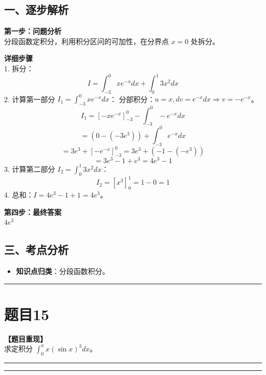 \documentclass[12pt, a4paper]{ctexart}
\newcommand{\TopSeparator}{
    \par\noindent\rule{\textwidth}{1.5pt}\vspace{0.5em} %
}
\newcommand{\AnalysisSeparator}{
    \par\noindent\rule{\textwidth}{0.5pt}\vspace{0.2em}\hrule\vspace{0.5em} %
}
\newenvironment{RedAnalysis}{
    \par
    \color{red} %
}{
    \par
    \color{black} %
}
\begin{document}
\begin{RedAnalysis}

\subsection*{一、逐步解析}

\textbf{第一步：问题分析} \\
分段函数定积分，利用积分区问的可加性，在分界点 $x=0$ 处拆分。

\textbf{详细步骤} \\
1. 拆分：
   \[ I = \int_{-3}^0 xe^{-x} dx + \int_0^1 3x^2 dx \]
2. 计算第一部分 $I_1 = \int_{-3}^0 xe^{-x} dx$：
   分部积分：$u=x, dv=e^{-x}dx \Rightarrow v=-e^{-x}$。
   \[ I_1 = [-xe^{-x}]_{-3}^0 - \int_{-3}^0 -e^{-x} dx \]
   \[ = (0 - (-3e^3)) + \int_{-3}^0 e^{-x} dx \]
   \[ = 3e^3 + [-e^{-x}]_{-3}^0 = 3e^3 + (-1 - (-e^3)) \]
   \[ = 3e^3 - 1 + e^3 = 4e^3 - 1 \]
3. 计算第二部分 $I_2 = \int_0^1 3x^2 dx$：
   \[ I_2 = [x^3]_0^1 = 1 - 0 = 1 \]
4. 总和：$I = 4e^3 - 1 + 1 = 4e^3$。

\textbf{第四步：最终答案} \\
$ 4e^3 $

\subsection*{三、考点分析}
\begin{itemize}
    \item \textbf{知识点归类}：分段函数积分。
\end{itemize}

\end{RedAnalysis}

\vspace{2em}

\TopSeparator
\section*{题目15}

\textbf{【题目重现】} \\
求定积分 $ \int_{0}^{\pi} x(\sin x)^{3}dx $。

\AnalysisSeparator
\end{document}
